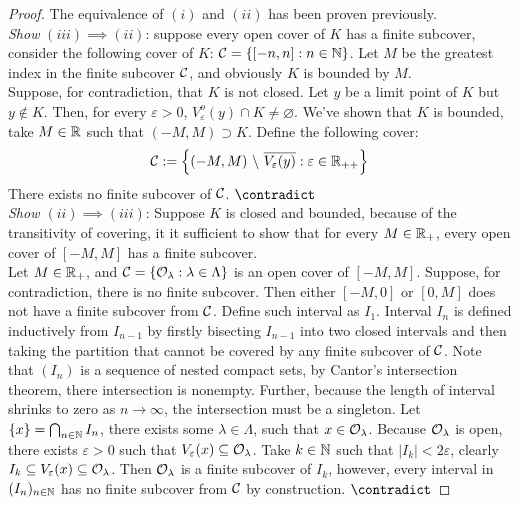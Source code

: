 \documentclass[11pt]{article}
\begin{document}
	\begin{proof}
		The equivalence of $(i)$ and $(ii)$ has been proven previously. \\
		\emph{Show} $(iii) \implies (ii)$: suppose every open cover of $K$ has a finite subcover, consider the following cover of $K$: $\mathcal{{C}} = \{[-n, n]: n \in \mathbb{N}\}$. Let $M$ be the greatest index in the finite subcover $\mathcal{{C}}$, and obviously $K$ is bounded by $M$. \\
		Suppose, for contradiction, that $K$ is not closed. Let $y$ be a limit point of $K$ but $y \notin K$. Then, for every $\varepsilon > 0$, $V_\varepsilon^o(y) \cap K \neq \varnothing$. We've shown that $K$ is bounded, take $M \in \mathbb{R}$ such that $(-M, M) \supset K$. Define the following cover:
		\begin{align}
			\mathcal{{C}} := \left\{
			(-M, M)\ \backslash\ \overline{V_\varepsilon(y)}
			:\varepsilon \in \mathbb{R}_{++}
			\right\}
		\end{align}
		There exists no finite subcover of $\mathcal{{C}}$. $\contradict$ \\
		\emph{Show $(ii) \implies (iii)$}: Suppose $K$ is closed and bounded, because of the transitivity of covering, it it sufficient to show that for every $M \in \mathbb{R}_+$, every open cover of $[-M, M]$ has a finite subcover. \\
		Let $M \in \mathbb{R}_+$, and $\mathcal{{C}} = \{\mathcal{{O}}_\lambda: \lambda \in \Lambda\}$ is an open cover of $[-M, M]$. Suppose, for contradiction, there is no finite subcover. Then either $[-M, 0]$ or $[0, M]$ does not have a finite subcover from $\mathcal{{C}}$. Define such interval as $I_1$. Interval $I_n$ is defined inductively from $I_{n-1}$ by firstly bisecting $I_{n-1}$ into two closed intervals and then taking the partition that cannot be covered by any finite subcover of $\mathcal{{C}}$. Note that $(I_n)$ is a sequence of nested compact sets, by Cantor's intersection theorem, there intersection is nonempty. Further, because the length of interval shrinks to zero as $n \to \infty$, the intersection must be a singleton. Let $\{x\} = \bigcap_{n \in \mathbb{N}} I_n$, there exists some $\lambda \in \Lambda$, such that $x \in \mathcal{{O}}_\lambda$. Because $\mathcal{{O}}_\lambda$ is open, there exists $\varepsilon > 0$ such that $V_\varepsilon(x) \subseteq \mathcal{{O}}_\lambda$. Take $k \in \mathbb{N}$ such that $|I_k| < 2\varepsilon$, clearly $I_k \subseteq V_\varepsilon(x) \subseteq \mathcal{{O}}_\lambda$. Then $\mathcal{{O}}_\lambda$ is a finite subcover of $I_k$, however, every interval in $(I_n)_{n \in \mathbb{N}}$ has no finite subcover from $\mathcal{{C}}$ by construction. $\contradict$
	\end{proof}
\end{document}
